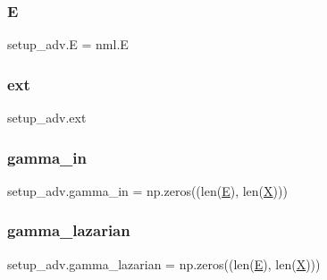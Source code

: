 \mbox{\label{namespacesetup__adv_a5934fd9692b0afe75afd78fb1f301443}} 
\subsubsection{\texorpdfstring{E}{E}}
{\footnotesize\ttfamily setup\+\_\+adv.\+E = nml.\+E}

\mbox{\label{namespacesetup__adv_aa5263a4dd6e33af764c6d7e87bd39590}} 
\subsubsection{\texorpdfstring{ext}{ext}}
{\footnotesize\ttfamily setup\+\_\+adv.\+ext}

\mbox{\label{namespacesetup__adv_a67eeb833d3be6b4e581801ad852564eb}} 
\subsubsection{\texorpdfstring{gamma\+\_\+in}{gamma\_in}}
{\footnotesize\ttfamily setup\+\_\+adv.\+gamma\+\_\+in = np.\+zeros((len(\hyperlink{namespacesetup__adv_a5934fd9692b0afe75afd78fb1f301443}{E}), len(\hyperlink{namespacesetup__adv_a6d9cd2ec966fe51739f30fabc346a12b}{X})))}

\mbox{\label{namespacesetup__adv_adaeb721451261baf9a7fd02ea090dcc0}} 
\subsubsection{\texorpdfstring{gamma\+\_\+lazarian}{gamma\_lazarian}}
{\footnotesize\ttfamily setup\+\_\+adv.\+gamma\+\_\+lazarian = np.\+zeros((len(\hyperlink{namespacesetup__adv_a5934fd9692b0afe75afd78fb1f301443}{E}), len(\hyperlink{namespacesetup__adv_a6d9cd2ec966fe51739f30fabc346a12b}{X})))}

